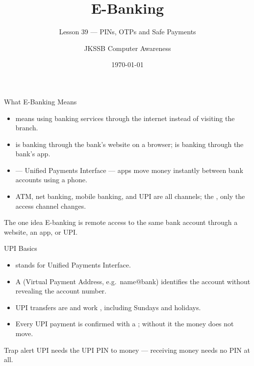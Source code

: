\documentclass[aspectratio=169]{beamer}
\title{E-Banking}
\subtitle{Lesson 39 --- PINs, OTPs and Safe Payments}
\author{JKSSB Computer Awareness}
\date{\today}
\begin{document}
\frame{\titlepage}

\begin{frame}{What E-Banking Means}
  \begin{itemize}
    \item {} means using banking services through the internet
      instead of visiting the branch.
    \item {} is banking through the bank's website on a
      browser;  is banking through the bank's app.
    \item {} --- Unified Payments Interface --- apps move money
      instantly between bank accounts using a phone.
    \item ATM, net banking, mobile banking, and UPI are all channels; the
      , only the access channel changes.
  \end{itemize}
  \begin{block}{The one idea}
    E-banking is remote access to the same bank account through a website,
    an app, or UPI.
  \end{block}
\end{frame}

\begin{frame}{UPI Basics}
  \begin{itemize}
    \item {} stands for Unified Payments Interface.
    \item A  (Virtual Payment Address, e.g.\ name@bank) identifies
      the account without revealing the account number.
    \item UPI transfers are  and work ,
      including Sundays and holidays.
    \item Every UPI payment is confirmed with a ; without it the
      money does not move.
  \end{itemize}
  \begin{alertblock}{Trap alert}
    UPI needs the UPI PIN to  money --- receiving money needs no
    PIN at all.
  \end{alertblock}
\end{frame}
\end{document}
